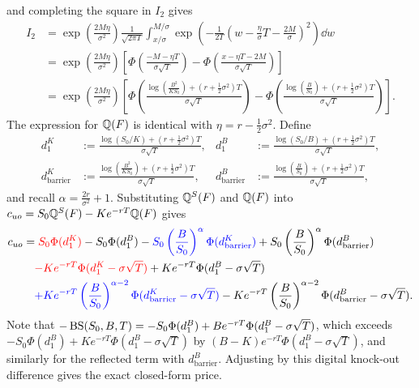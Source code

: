 and completing the square in $I_2$ gives
\[
\begin{aligned}
    I_2 &= \exp\left(\frac{2M\eta}{\sigma^2}\right)\frac{1}{\sqrt{2\pi T}}\int_{x/\sigma}^{M/\sigma} \exp\left(-\frac{1}{2T}\left(w - \frac{\eta}{\sigma}T - \frac{2M}{\sigma}\right)^2\right)\dd w \\
        &= \exp\left(\frac{2M\eta}{\sigma^2}\right)\left[\Phi\left(\frac{-M - \eta T}{\sigma\sqrt{T}}\right) - \Phi\left(\frac{x - \eta T - 2M}{\sigma\sqrt{T}}\right)\right] \\
        &= \exp\left(\frac{2M\eta}{\sigma^2}\right)\left[\Phi\left(\frac{\log\left(\frac{B^2}{K S_0}\right) + \left(r + \frac{1}{2}\sigma^2\right)T}{\sigma\sqrt{T}}\right) - \Phi\left(\frac{\log\left(\frac{B}{S_0}\right) + \left(r + \frac{1}{2}\sigma^2\right)T}{\sigma\sqrt{T}}\right)\right].
\end{aligned}
\]
The expression for $\mathbb{Q}(F)$ is identical with $\eta = r - \frac{1}{2}\sigma^2$. Define
\[
\begin{aligned}
    d_1^K &:= \frac{\log(S_0/K) + \left(r + \frac{1}{2}\sigma^2\right)T}{\sigma\sqrt{T}}, &
    d_1^B &:= \frac{\log(S_0/B) + \left(r + \frac{1}{2}\sigma^2\right)T}{\sigma\sqrt{T}}, \\
    d_{\text{barrier}}^K &:= \frac{\log\left(\frac{B^2}{K S_0}\right) + \left(r + \frac{1}{2}\sigma^2\right)T}{\sigma\sqrt{T}}, &
    d_{\text{barrier}}^B &:= \frac{\log\left(\frac{B}{S_0}\right) + \left(r + \frac{1}{2}\sigma^2\right)T}{\sigma\sqrt{T}},
\end{aligned}
\]
and recall $\alpha = \frac{2r}{\sigma^2} + 1$. Substituting $\mathbb{Q}^S(F)$ and $\mathbb{Q}(F)$ into $c_{uo} = S_0 \mathbb{Q}^S(F) - K e^{-rT}\mathbb{Q}(F)$ gives
\[
\begin{aligned}
    c_{uo} &= \textcolor{red}{S_0\Phi(d_1^K)} - S_0\Phi(d_1^B) - \textcolor{blue}{S_0\left(\frac{B}{S_0}\right)^\alpha \Phi(d_{\text{barrier}}^K)} + S_0\left(\frac{B}{S_0}\right)^\alpha \Phi(d_{\text{barrier}}^B) \\
           &\quad \textcolor{red}{- K e^{-rT}\Phi(d_1^K - \sigma\sqrt{T})} + K e^{-rT}\Phi(d_1^B - \sigma\sqrt{T}) \\
           &\quad \textcolor{blue}{+ K e^{-rT}\left(\frac{B}{S_0}\right)^{\alpha - 2}\Phi(d_{\text{barrier}}^K - \sigma\sqrt{T})} - K e^{-rT}\left(\frac{B}{S_0}\right)^{\alpha - 2}\Phi(d_{\text{barrier}}^B - \sigma\sqrt{T}).
\end{aligned}
\]
Note that $-\operatorname{BS}(S_0, B, T) = -S_0\Phi(d_1^B) + B e^{-rT}\Phi(d_1^B - \sigma\sqrt{T})$, which exceeds $-S_0\Phi(d_1^B) + K e^{-rT}\Phi(d_1^B - \sigma\sqrt{T})$ by $(B - K)e^{-rT}\Phi(d_1^B - \sigma\sqrt{T})$, and similarly for the reflected term with $d_{\text{barrier}}^B$. Adjusting by this digital knock-out difference gives the exact closed-form price.

